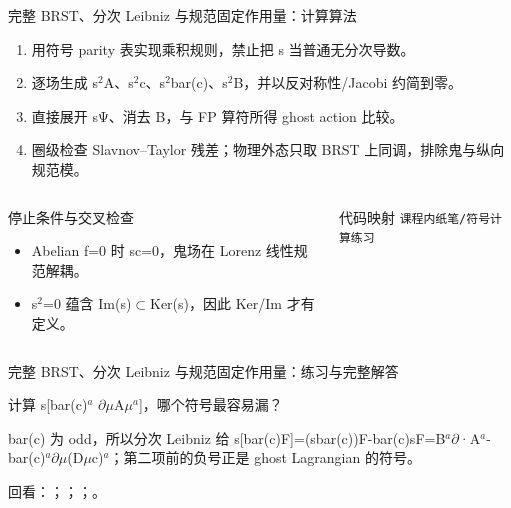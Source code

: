 \begin{frame}[t]{完整 BRST、分次 Leibniz 与规范固定作用量：计算算法}
\footnotesize
{}\begin{enumerate}
\item 用符号 parity 表实现乘积规则，禁止把 s 当普通无分次导数。
\item 逐场生成 s\ensuremath{^{2}}A、s\ensuremath{^{2}}c、s\ensuremath{^{2}}bar(c)、s\ensuremath{^{2}}B，并以反对称性/\allowbreak{}Jacobi 约简到零。
\item 直接展开 sΨ、消去 B，与 FP 算符所得 ghost action 比较。
\item 圈级检查 Slavnov--Taylor 残差；物理外态只取 BRST 上同调，排除鬼与纵向规范模。
\end{enumerate}\begin{columns}[T,onlytextwidth]
\begin{block}{停止条件与交叉检查}\scriptsize\begin{itemize}
\item[\CheckMark] Abelian f=0 时 sc=0，鬼场在 Lorenz 线性规范解耦。
\item[\CheckMark] s\ensuremath{^{2}}=0 蕴含 Im(s)\ensuremath{\subset}Ker(s)，因此 Ker/\allowbreak{}Im 才有定义。
\end{itemize}\end{block}
\begin{block}{代码映射}
\scriptsize \texttt{课程内纸笔/\allowbreak{}符号计算练习}
\end{block}\end{columns}\end{frame}

\begin{frame}[t]{完整 BRST、分次 Leibniz 与规范固定作用量：练习与完整解答}
\footnotesize
\begin{block}{}计算 s[bar(c)\ensuremath{^{a}} \ensuremath{\partial}\ensuremath{\mu}A\ensuremath{\mu}\ensuremath{^{a}}]，哪个符号最容易漏？\end{block}
\begin{exampleblock}{}bar(c) 为 odd，所以分次 Leibniz 给 s[bar(c)F]=(sbar(c))F-bar(c)sF=B\ensuremath{^{a}}\ensuremath{\partial}·A\ensuremath{^{a}}-bar(c)\ensuremath{^{a}}\ensuremath{\partial}\ensuremath{\mu}(D\ensuremath{\mu}c)\ensuremath{^{a}}；第二项前的负号正是 ghost Lagrangian 的符号。\end{exampleblock}
\vfill
\scriptsize 回看：；；；。
\end{frame}

